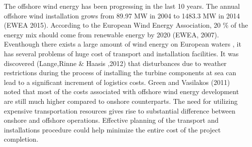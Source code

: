 \begin{introduction}

The offshore wind energy has been progressing in the last 10 years. The annual offshore wind installation grows from 89.97 MW in 2004 to 1483.3 MW in 2014 (EWEA 2015). According to the European Wind Energy Association, 20 \% of the energy mix should come from renewable energy by 2020 (EWEA, 2007). Eventhough there exists a large amount of wind energy on European waters , it has several problems of huge cost of transport and installation facilities. It was discovered (Lange,Rinne & Haasis ,2012) that disturbances due to weather restrictions during the process of installing the turbine components at sea can lead to a significant increment of logistics costs. Green and Vasilakos (2011) noted that most of the costs associated with offshore wind energy development are still much higher compared to onshore counterparts. The need for utilizing expensive transportation resources gives rise to substantial difference between onshore and offshore operations.  Effective planning of the transport and installations procedure could help minimize the entire cost of the project completion. 

\end{introduction}
